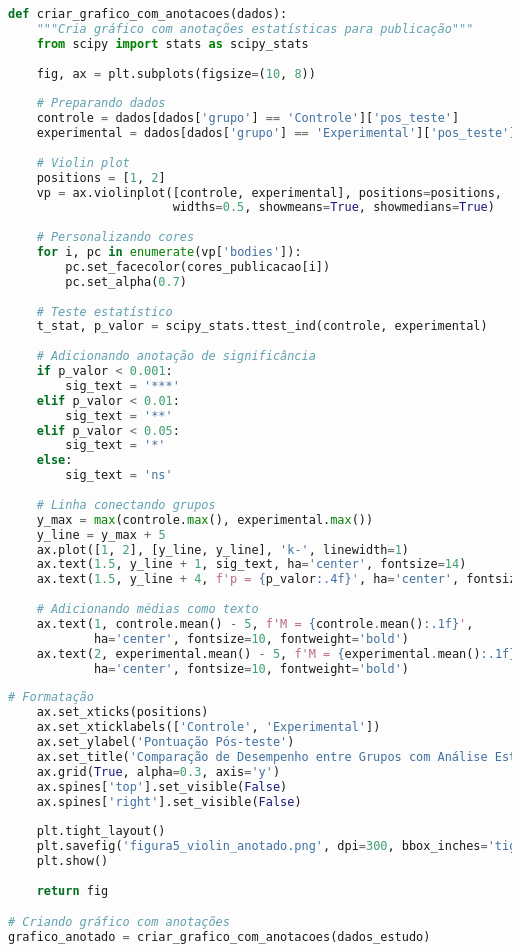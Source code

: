 \begin{pythonbox}
\begin{lstlisting}[language=Python]
def criar_grafico_com_anotacoes(dados):
    """Cria gráfico com anotações estatísticas para publicação"""
    from scipy import stats as scipy_stats
    
    fig, ax = plt.subplots(figsize=(10, 8))
    
    # Preparando dados
    controle = dados[dados['grupo'] == 'Controle']['pos_teste']
    experimental = dados[dados['grupo'] == 'Experimental']['pos_teste']
    
    # Violin plot
    positions = [1, 2]
    vp = ax.violinplot([controle, experimental], positions=positions, 
                       widths=0.5, showmeans=True, showmedians=True)
    
    # Personalizando cores
    for i, pc in enumerate(vp['bodies']):
        pc.set_facecolor(cores_publicacao[i])
        pc.set_alpha(0.7)
    
    # Teste estatístico
    t_stat, p_valor = scipy_stats.ttest_ind(controle, experimental)
    
    # Adicionando anotação de significância
    if p_valor < 0.001:
        sig_text = '***'
    elif p_valor < 0.01:
        sig_text = '**'
    elif p_valor < 0.05:
        sig_text = '*'
    else:
        sig_text = 'ns'
    
    # Linha conectando grupos
    y_max = max(controle.max(), experimental.max())
    y_line = y_max + 5
    ax.plot([1, 2], [y_line, y_line], 'k-', linewidth=1)
    ax.text(1.5, y_line + 1, sig_text, ha='center', fontsize=14)
    ax.text(1.5, y_line + 4, f'p = {p_valor:.4f}', ha='center', fontsize=10)
    
    # Adicionando médias como texto
    ax.text(1, controle.mean() - 5, f'M = {controle.mean():.1f}', 
            ha='center', fontsize=10, fontweight='bold')
    ax.text(2, experimental.mean() - 5, f'M = {experimental.mean():.1f}', 
            ha='center', fontsize=10, fontweight='bold')
       \end{lstlisting}
\end{pythonbox}

\begin{pythonbox}
\begin{lstlisting}[language=Python]       
    # Formatação
    ax.set_xticks(positions)
    ax.set_xticklabels(['Controle', 'Experimental'])
    ax.set_ylabel('Pontuação Pós-teste')
    ax.set_title('Comparação de Desempenho entre Grupos com Análise Estatística')
    ax.grid(True, alpha=0.3, axis='y')
    ax.spines['top'].set_visible(False)
    ax.spines['right'].set_visible(False)
    
    plt.tight_layout()
    plt.savefig('figura5_violin_anotado.png', dpi=300, bbox_inches='tight')
    plt.show()
    
    return fig

# Criando gráfico com anotações
grafico_anotado = criar_grafico_com_anotacoes(dados_estudo)
\end{lstlisting}
\end{pythonbox}

